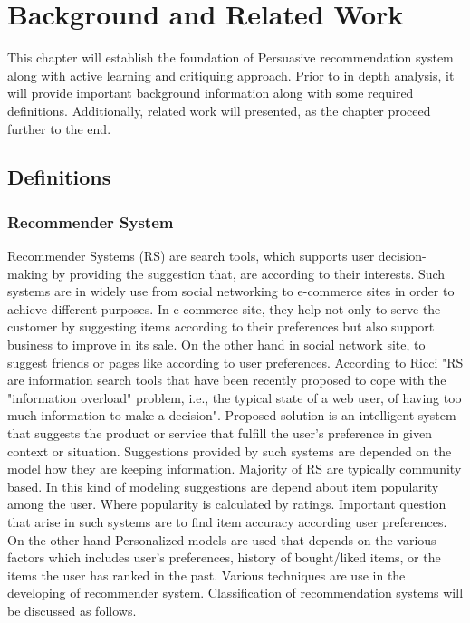 
\chapter{Background and Related Work}

This chapter will establish the foundation of Persuasive recommendation system along with active learning and critiquing approach. Prior to in depth analysis, it will provide important background information along with some required definitions. Additionally, related work will presented, as the chapter proceed further to the end.

\section{Definitions}

\subsection{Recommender System}

Recommender Systems (RS) are search tools, which supports user decision-making by providing the suggestion that, are according to their interests. Such systems are in widely use from social networking to e-commerce sites in order to achieve different purposes. In e-commerce site, they help not only to serve the customer by suggesting items according to their preferences but also support business to improve in its sale. On the other hand in social network site, to suggest friends or pages like according to user preferences. According to Ricci \cite{ricci2010mobile} "RS are information search tools that have been recently proposed to cope with the "information overload" problem, i.e., the typical state of a web user, of having too much information to make a decision". Proposed solution \cite{resnick1997recommender} is an intelligent system that suggests the product or service that fulfill the user’s preference in given context or situation. Suggestions provided by such systems are depended on the model how they are keeping information. Majority of RS are typically community based. In this kind of modeling suggestions are depend about item popularity among the user. Where popularity is calculated by ratings. Important question that arise in such systems are to find item accuracy according user preferences. On the other hand Personalized models are used that depends on the various factors which includes user’s preferences, history of bought/liked items, or the items the user has ranked in the past. Various techniques are use in the developing of recommender system. Classification of recommendation systems \cite{ricci2011introduction} will be discussed as follows.

